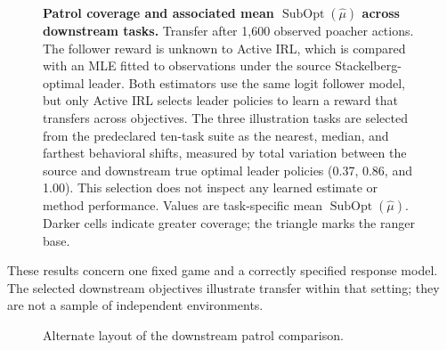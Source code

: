 \begin{figure}[t]
  \centering
  \caption{\textbf{Patrol coverage and associated mean
  $\operatorname{SubOpt}(\hat\mu)$ across downstream tasks.} Transfer after
  1,600 observed poacher actions. The follower reward is unknown to Active IRL,
  which is compared with an MLE fitted to observations under the source
  Stackelberg-optimal leader. Both estimators use the same logit follower model, but only Active IRL
  selects leader policies to learn a reward that transfers across objectives.
  The three illustration tasks are selected from the predeclared ten-task suite
  as the nearest, median, and farthest behavioral shifts, measured by total
  variation between the source and downstream true optimal leader policies
  (0.37, 0.86, and 1.00). This selection does not inspect any learned estimate
  or method performance. Values are task-specific mean
  $\operatorname{SubOpt}(\hat\mu)$. Darker
  cells indicate greater coverage; the triangle marks the ranger base.}
  \label{fig:downstream-transfer}
\end{figure}

These results concern one fixed game and a correctly specified response model.
The selected downstream objectives illustrate transfer within that setting;
they are not a sample of independent environments.

\begin{figure}[p]
  \centering
  \resizebox{\textwidth}{!}{%
  }
  \caption{Alternate layout of the downstream patrol comparison.}
\end{figure}
